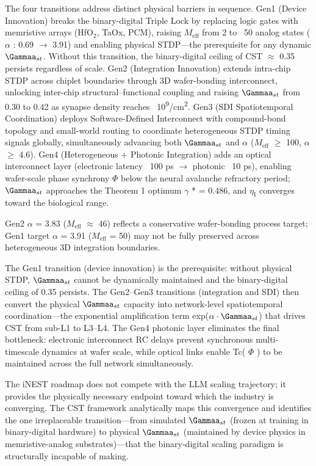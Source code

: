 \documentclass[a4paper,12pt]{article}
\providecommand{\textsubscript}[1]{\ensuremath{_{\text{#1}}}}
\begin{document}
The four transitions address distinct physical barriers in sequence.
Gen1 (Device Innovation) breaks the binary-digital Triple Lock by replacing logic gates with memristive arrays (HfO\textsubscript{2}, TaOx, PCM), raising $M_{\text{eff}}$ from 2 to ~50 analog states ( $\alpha$ : 0.69 $\rightarrow$ 3.91) and enabling physical STDP---the prerequisite for any dynamic $\Gammaa_{st}$.
Without this transition, the binary-digital ceiling of CST  $\approx$  0.35 persists regardless of scale.
Gen2 (Integration Innovation) extends intra-chip STDP across chiplet boundaries through 3D wafer-bonding interconnect, unlocking inter-chip structural--functional coupling and raising $\Gammaa_{st}$ from 0.30 to 0.42 as synapse density reaches ~10\textsuperscript{9}/cm\textsuperscript{2}.
Gen3 (SDI Spatiotemporal Coordination) deploys Software-Defined Interconnect with compound-bond topology and small-world routing to coordinate heterogeneous STDP timing signals globally, simultaneously advancing both $\Gammaa_{st}$ and  $\alpha$  ($M_{\text{eff}}$  $\geq$  100,  $\alpha$   $\geq$  4.6).
Gen4 (Heterogeneous + Photonic Integration) adds an optical interconnect layer (electronic latency ~100 ps  $\rightarrow$  photonic ~10 ps), enabling wafer-scale phase synchrony  $\Phi$  below the neural avalanche refractory period; $\Gammaa_{st}$ approaches the Theorem 1 optimum  $\gamma$ * = 0.486, and $\eta_{\text{I}}$ converges toward the biological range.

\dag{}Gen2  $\alpha$  = 3.83 ($M_{\text{eff}}$  $\approx$  46) reflects a conservative wafer-bonding process target; Gen1 target  $\alpha$  = 3.91 ($M_{\text{eff}}$ = 50) may not be fully preserved across heterogeneous 3D integration boundaries.

The Gen1 transition (device innovation) is the prerequisite: without physical STDP, $\Gammaa_{st}$ cannot be dynamically maintained and the binary-digital ceiling of 0.35 persists.
The Gen2--Gen3 transitions (integration and SDI) then convert the physical $\Gammaa_{st}$ capacity into network-level spatiotemporal coordination---the exponential amplification term exp($\alpha \cdot \Gammaa_{st}$) that drives CST from sub-L1 to L3--L4.
The Gen4 photonic layer eliminates the final bottleneck: electronic interconnect RC delays prevent synchronous multi-timescale dynamics at wafer scale, while optical links enable Tc( $\Phi$ ) to be maintained across the full network simultaneously.

The iNEST roadmap does not compete with the LLM scaling trajectory; it provides the physically necessary endpoint toward which the industry is converging.
The CST framework analytically maps this convergence and identifies the one irreplaceable transition---from simulated $\Gammaa_{st}$ (frozen at training in binary-digital hardware) to physical $\Gammaa_{st}$ (maintained by device physics in memristive-analog substrates)---that the binary-digital scaling paradigm is structurally incapable of making.
\end{document}
